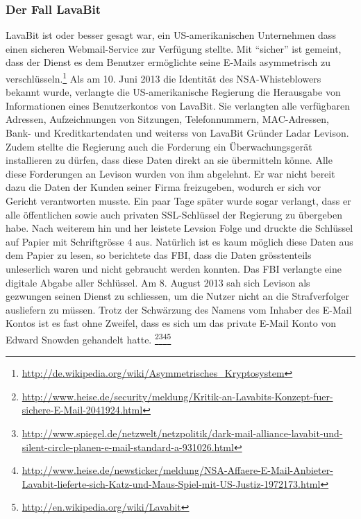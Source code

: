 \subsubsection{Der Fall LavaBit}
LavaBit ist oder besser gesagt war, ein US-amerikanischen Unternehmen dass einen sicheren Webmail-Service zur Verfügung stellte.
Mit ``sicher'' ist gemeint, dass der Dienst es dem Benutzer ermöglichte seine E-Mails asymmetrisch zu verschlüsseln.\footnote{\url{http://de.wikipedia.org/wiki/Asymmetrisches_Kryptosystem}}
Als am 10. Juni 2013 die Identität des NSA-Whisteblowers bekannt wurde, verlangte die US-amerikanische Regierung die Herausgabe von Informationen eines Benutzerkontos von LavaBit.
Sie verlangten alle verfügbaren Adressen, Aufzeichnungen von Sitzungen, Telefonnummern, MAC-Adressen, Bank- und Kreditkartendaten und weiterss von LavaBit Gründer Ladar Levison. Zudem stellte die Regierung auch die Forderung ein Überwachungsgerät installieren zu dürfen, dass diese Daten direkt an sie übermitteln könne. Alle diese Forderungen an Levison wurden von ihm abgelehnt. Er war nicht bereit dazu die Daten der Kunden seiner Firma freizugeben, wodurch er sich vor Gericht verantworten musste.
Ein paar Tage später wurde sogar verlangt, dass er alle öffentlichen sowie auch privaten SSL-Schlüssel der Regierung zu übergeben habe. Nach weiterem hin und her leistete Levsion Folge und druckte die Schlüssel auf Papier mit Schriftgrösse 4 aus. Natürlich ist es kaum möglich diese Daten aus dem Papier zu lesen, so berichtete das FBI, dass die Daten grösstenteils unleserlich waren und nicht gebraucht werden konnten. Das FBI verlangte eine digitale Abgabe aller Schlüssel.
Am 8. August 2013 sah sich Levison als gezwungen seinen Dienst zu schliessen, um die Nutzer nicht an die Strafverfolger ausliefern zu müssen.
Trotz der Schwärzung des Namens vom Inhaber des E-Mail Kontos ist es fast ohne Zweifel, dass es sich um das private E-Mail Konto von Edward Snowden gehandelt hatte.
\footnote{\url{http://www.heise.de/security/meldung/Kritik-an-Lavabits-Konzept-fuer-sichere-E-Mail-2041924.html}}\footnote{\url{http://www.spiegel.de/netzwelt/netzpolitik/dark-mail-alliance-lavabit-und-silent-circle-planen-e-mail-standard-a-931026.html}}\footnote{\url{http://www.heise.de/newsticker/meldung/NSA-Affaere-E-Mail-Anbieter-Lavabit-lieferte-sich-Katz-und-Maus-Spiel-mit-US-Justiz-1972173.html}}\footnote{\url{http://en.wikipedia.org/wiki/Lavabit}}


